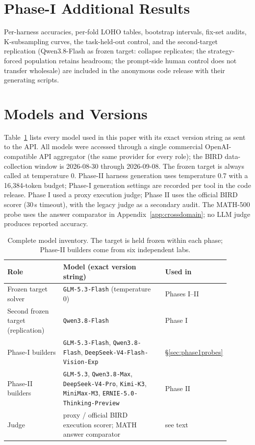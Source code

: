\section{Phase-I Additional Results}\label{app:phase1-results}
Per-harness accuracies, per-fold LOHO tables, bootstrap intervals,
fix-set audits, K-subsampling curves, the task-held-out control, and the
second-target replication (Qwen3.8-Flash as frozen target: collapse
replicates; the strategy-forced population retains headroom; the
prompt-side human control does not transfer wholesale) are included in
the anonymous code release with their generating scripts.

\section{Models and Versions}\label{app:models}

Table~\ref{tab:models} lists every model used in this paper with its exact
version string as sent to the API. All models were accessed through a single
commercial OpenAI-compatible API aggregator (the same provider for every
role); the BIRD data-collection window is 2026-08-30 through 2026-09-08. The frozen
target is always called at temperature 0. Phase-II harness generation uses
temperature 0.7 with a 16{,}384-token budget; Phase-I generation settings are
recorded per tool in the code release. Phase I used a proxy execution judge;
Phase II uses the official BIRD scorer (30\,s timeout), with the legacy
judge as a secondary audit. The MATH-500 probe uses the answer comparator
in Appendix~\ref{app:crossdomain}; no LLM judge produces reported accuracy.

\begin{table}[h]
\centering
\small
\begin{tabular}{p{0.26\linewidth}p{0.50\linewidth}p{0.14\linewidth}}
\toprule
Role & Model (exact version string) & Used in \\
\midrule
Frozen target solver & \texttt{GLM-5.3-Flash} (temperature 0) & Phases I--II \\
Second frozen target (replication) & \texttt{Qwen3.8-Flash} & Phase I \\
Phase-I builders & \texttt{GLM-5.3-Flash}, \texttt{Qwen3.8-Flash},
\texttt{DeepSeek-V4-Flash-Vision-Exp} & \S\ref{sec:phase1probes} \\
Phase-II builders & \texttt{GLM-5.3}, \texttt{Qwen3.8-Max},
\texttt{DeepSeek-V4-Pro}, \texttt{Kimi-K3}, \texttt{MiniMax-M3},
\texttt{ERNIE-5.0-Thinking-Preview} & Phase II \\
Judge & proxy / official BIRD execution scorer; MATH answer comparator & see text \\
\bottomrule
\end{tabular}
\caption{Complete model inventory. The target is held frozen within each
phase; Phase-II builders come from six independent labs.}
\label{tab:models}
\end{table}

